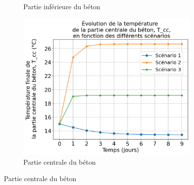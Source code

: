 \documentclass[12pt]{article}
\begin{document}
\begin{figure}
\begin{subfigure}{0.48\textwidth}
                \caption{Partie inférieure du béton} 
                \label{fig:Tc2}
            \end{subfigure}
            \begin{subfigure}{0.48\textwidth}
                \centering
                \includegraphics[width=1\linewidth]{Rapport/figures/T_cc.png}
                \caption{Partie centrale du béton} 
                \label{fig:Tcc}
            \end{subfigure}
            

\end{figure}
\end{document}
